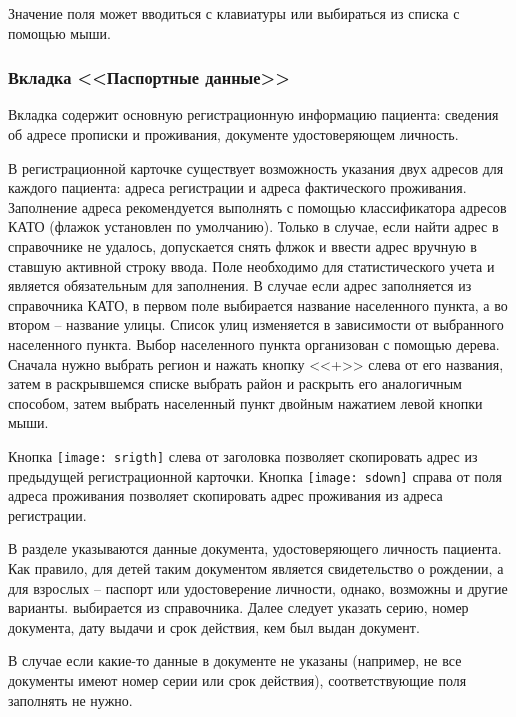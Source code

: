 Значение поля  может вводиться с клавиатуры или выбираться из списка с помощью мыши.

\subsubsection{Вкладка <<Паспортные данные>>}

Вкладка  содержит основную регистрационную информацию пациента: сведения об адресе прописки и проживания, документе удостоверяющем личность.

В регистрационной карточке существует возможность указания двух адресов для каждого пациента: адреса регистрации и адреса фактического проживания. Заполнение адреса рекомендуется выполнять с помощью классификатора адресов КАТО (флажок  установлен по умолчанию). Только в случае, если найти адрес в справочнике не удалось, допускается снять флжок  и ввести адрес вручную в ставшую активной строку ввода. Поле  необходимо для статистического учета и является обязательным для заполнения. В случае если адрес заполняется из справочника КАТО, в первом поле выбирается название населенного пункта, а во втором – название улицы. Список улиц изменяется в зависимости от выбранного населенного пункта. Выбор населенного пункта организован с помощью дерева. Сначала нужно выбрать регион и нажать кнопку <<+>> слева от его названия, затем в раскрывшемся списке выбрать район и раскрыть его аналогичным способом, затем выбрать населенный пункт двойным нажатием левой кнопки мыши.

\begin{prim}
Кнопка \texttt{[image: srigth]} слева от заголовка  позволяет скопировать адрес из предыдущей регистрационной карточки. Кнопка \texttt{[image: sdown]} справа от поля  адреса проживания позволяет скопировать адрес проживания из адреса регистрации.
\end{prim}

В разделе  указываются данные документа, удостоверяющего личность пациента. Как правило, для детей таким документом является свидетельство о рождении, а для взрослых – паспорт или удостоверение личности, однако, возможны и другие варианты.  выбирается из справочника. Далее следует указать серию, номер документа, дату выдачи и срок действия, кем был выдан документ.

В случае если какие-то данные в документе не указаны (например, не все документы имеют номер серии или срок действия), соответствующие поля заполнять не нужно.

